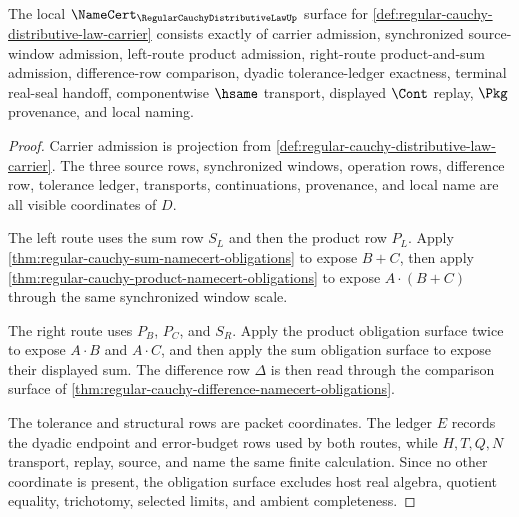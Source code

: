 \begin{theorem}
\label{thm:regular-cauchy-distributive-law-namecert-obligations}
The local $\NameCert_{\RegularCauchyDistributiveLawUp}$ surface for \autoref{def:regular-cauchy-distributive-law-carrier} consists exactly of carrier admission, synchronized source-window admission, left-route product admission, right-route product-and-sum admission, difference-row comparison, dyadic tolerance-ledger exactness, terminal real-seal handoff, componentwise $\hsame$ transport, displayed $\Cont$ replay, $\Pkg$ provenance, and local naming.
\end{theorem}
\begin{proof}
Carrier admission is projection from \autoref{def:regular-cauchy-distributive-law-carrier}. The three source rows, synchronized windows, operation rows, difference row, tolerance ledger, transports, continuations, provenance, and local name are all visible coordinates of $D$.

The left route uses the sum row $S_L$ and then the product row $P_L$. Apply \autoref{thm:regular-cauchy-sum-namecert-obligations} to expose $B+C$, then apply \autoref{thm:regular-cauchy-product-namecert-obligations} to expose $A\cdot(B+C)$ through the same synchronized window scale.

The right route uses $P_B$, $P_C$, and $S_R$. Apply the product obligation surface twice to expose $A\cdot B$ and $A\cdot C$, and then apply the sum obligation surface to expose their displayed sum. The difference row $\Delta$ is then read through the comparison surface of \autoref{thm:regular-cauchy-difference-namecert-obligations}.

The tolerance and structural rows are packet coordinates. The ledger $E$ records the dyadic endpoint and error-budget rows used by both routes, while $H,T,Q,N$ transport, replay, source, and name the same finite calculation. Since no other coordinate is present, the obligation surface excludes host real algebra, quotient equality, trichotomy, selected limits, and ambient completeness.
\end{proof}

